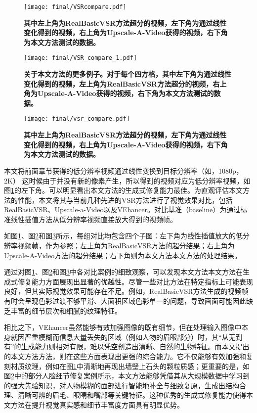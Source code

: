 \begin{figure}[h]
    \centering
    \texttt{[image: final/VSRcompare.pdf]}
    \caption{\textbf{其中左上角为RealBasicVSR方法超分的视频，左下角为通过线性变化得到的视频，右上角为Upscale-A-Video获得的视频，右下角为本文方法测试的数据。}}
    \label{fig:vsr2}
\end{figure}

\begin{figure}[h]
    \centering
    \texttt{[image: final/VSR\_compare\_1.pdf]}
    \caption{\textbf{关于本文方法的更多例子。对于每个四方格，其中左下角为通过线性变化得到的视频，左上角为RealBasicVSR方法超分的视频，右上角为Upscale-A-Video获得的视频，右下角为本文方法测试的数据。}}
    \label{fig:vsr3}
\end{figure}

\begin{figure}[h]
    \centering
    \texttt{[image: final/vsr\_compare.pdf]}
    \caption{\textbf{其中左上角为RealBasicVSR方法超分的视频，左下角为通过线性变化得到的视频，右上角为Upscale-A-Video获得的视频，右下角为本文方法测试的数据。}}
    \label{fig:vsr1}
\end{figure}


本文将前面章节获得的低分辨率视频通过线性变换到目标分辨率（如，1080p， 2K） 这时候由于并没有新的像素产生，所以得到的视频对应为低分辨率视频，如图\ref{fig:vsr2}的左下角。可以明显看出本文方法的生成式修复能力最佳。为直观评估本文方法的性能，本文将其与当前几种先进的VSR方法进行了视觉效果对比，包括RealBasicVSR\cite{RealBasicVSR}、Upscale-a-Video\cite{zhou2024upscaleavideo}以及VEhancer\cite{he2024venhancer}。对比基准（baseline）为通过标准线性插值方法从低分辨率视频直接放大得到的视频帧。

如图\ref{fig:vsr2}、图\ref{fig:vsr3}和图\ref{fig:vsr1}所示，每组对比均包含四个子图：左下角为线性插值放大的低分辨率视频帧，作为参照；左上角为RealBasicVSR方法的超分结果；右上角为Upscale-A-Video方法的超分结果；右下角则为本文方法本文方法的处理结果。


通过对图\ref{fig:vsr2}、图\ref{fig:vsr3}和图\ref{fig:vsr1}中各对比案例的细致观察，可以发现本文方法本文方法在生成式修复能力方面展现出显著的优越性。尽管一些对比方法在特定指标上可能表现良好，但其实际视觉效果可能存在不足。例如，RealBasicVSR\cite{RealBasicVSR}方法生成的视频帧有时会呈现色彩过渡不够平滑、大面积区域色彩单一的问题，导致画面可能因此缺乏丰富的细节层次和细腻的纹理特征。

相比之下，VEhancer\cite{he2024venhancer}虽然能够有效加强图像的既有细节，但在处理输入图像中本身就因严重模糊而信息大量丢失的区域（例如人物的眉眼部分）时，其“从无到有”的生成能力则相对有限，难以凭空创造出清晰、自然的生物特征。而本文提出的本文方法方法，则在这些方面表现出更强的综合能力。它不仅能够有效加强和复刻材质纹理，例如在图\ref{fig:vsr2}中清晰地再现出墙壁上石头的颗粒质感；更重要的是，如图\ref{fig:vsr3}中的部分人脸细节修复案例所示，本文方法能够凭借其从大规模数据中学习到的强大先验知识，对人物模糊的面部进行智能地补全与细致复原，生成出结构合理、清晰可辨的眉毛、眼睛和嘴部等关键特征。这种优秀的生成式修复能力使得本文方法在提升视觉真实感和细节丰富度方面具有明显优势。


